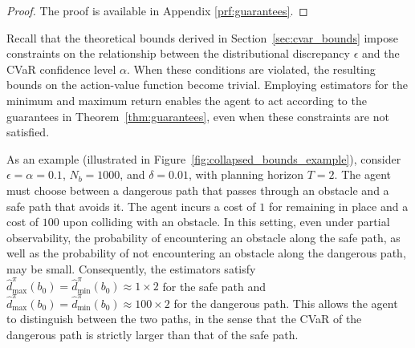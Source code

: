 \documentclass[acmlarge, manuscript, screen, review, natbib=false, oneside]{acmart}
\begin{document}
\begin{proof}
	The proof is available in Appendix \ref{prf:guarantees}.
\end{proof}
Recall that the theoretical bounds derived in Section~\ref{sec:cvar_bounds} impose constraints on the relationship between the distributional discrepancy $\epsilon$ and the CVaR confidence level $\alpha$. When these conditions are violated, the resulting bounds on the action-value function become trivial. Employing estimators for the minimum and maximum return enables the agent to act according to the guarantees in Theorem~\ref{thm:guarantees}, even when these constraints are not satisfied. 

As an example (illustrated in Figure~\ref{fig:collapsed_bounds_example}), consider $\epsilon=\alpha=0.1$, $N_b=1000$, and $\delta=0.01$, with planning horizon $T=2$. The agent must choose between a dangerous path that passes through an obstacle and a safe path that avoids it. The agent incurs a cost of $1$ for remaining in place and a cost of $100$ upon colliding with an obstacle. In this setting, even under partial observability, the probability of encountering an obstacle along the safe path, as well as the probability of not encountering an obstacle along the dangerous path, may be small. Consequently, the estimators satisfy $\hat{d}^\pi_{\max}(b_0)=\hat{d}^\pi_{\min}(b_0)\approx 1\times 2$ for the safe path and $\hat{d}^\pi_{\max}(b_0)=\hat{d}^\pi_{\min}(b_0)\approx 100\times 2$ for the dangerous path. This allows the agent to distinguish between the two paths, in the sense that the CVaR of the dangerous path is strictly larger than that of the safe path.
\end{document}
